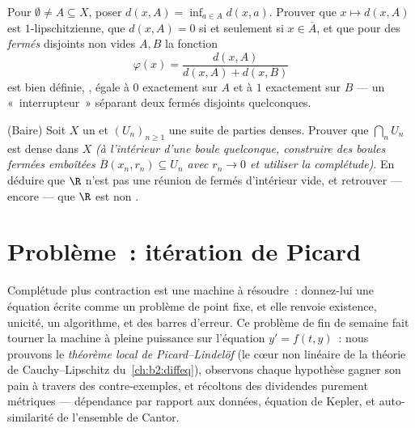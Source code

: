 \begin{exercise}[$\star\star$]\label{exo:b2:metric:11}
Pour $\emptyset \neq A \subseteq X$, poser $d(x, A) = \inf_{a \in A}
d(x, a)$. Prouver que $x \mapsto d(x, A)$ est $1$-lipschitzienne, que
$d(x, A) = 0$ si et seulement si $x \in \overline A$, et que pour des
\emph{fermés} disjoints non vides $A, B$ la fonction
\[
\varphi(x) = \frac{d(x, A)}{d(x, A) + d(x, B)}
\]
est bien définie, , égale à $0$ exactement sur $A$ et à $1$
exactement sur $B$ --- un «~interrupteur~»  séparant deux
fermés disjoints quelconques.
\end{exercise}

\begin{exercise}[$\star\star\star$]\label{exo:b2:metric:12}
(Baire) Soit $X$ un  et $(U_n)_{n\geq1}$ une
suite de parties  denses. Prouver que $\bigcap_n U_n$ est
dense dans $X$ \emph{(à l'intérieur d'une boule quelconque,
construire des boules fermées emboîtées $\overline B(x_n, r_n)
\subseteq U_n$ avec $r_n \to 0$ et utiliser la complétude)}. En
déduire que $\R$ n'est pas une réunion  de fermés
d'intérieur vide, et retrouver --- encore --- que $\R$ est non
.
\end{exercise}

\section{Problème~: itération de Picard}

Complétude plus contraction est une machine à résoudre~: donnez-lui
une équation écrite comme un problème de point fixe, et elle renvoie
existence, unicité, un algorithme, et des barres d'erreur. Ce problème
de fin de semaine fait tourner la machine à pleine puissance sur
l'équation $y' = f(t, y)$~: nous prouvons le \emph{théorème local de
Picard--Lindelöf} (le cœur non linéaire de la théorie de
Cauchy--Lipschitz du~\cref{ch:b2:diffeq}), observons chaque hypothèse
gagner son pain à travers des contre-exemples, et récoltons des
dividendes purement métriques --- dépendance  par rapport aux
données, équation de Kepler, et auto-similarité de l'ensemble de
Cantor.

